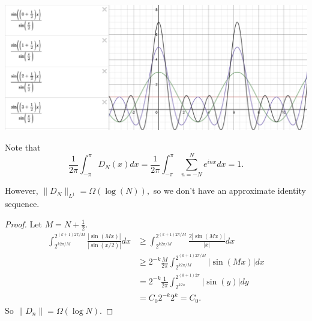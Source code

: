 \documentclass[11pt]{scrartcl}
\newcommand{\<}{\langle}
\renewcommand{\>}{\rangle}
\begin{document}
\begin{center}
\includegraphics[scale=0.35]{dn.png}
\end{center}

Note that $$\frac{1}{2\pi} \int_{-\pi}^\pi D_N(x)dx = \frac{1}{2\pi}\int_{-\pi}^\pi \sum_{n = -N}^N e^{inx}dx = 1.$$

However, $\|D_N\|_{L^1} = \Omega(\log (N)),$ so we don't have an approximate identity sequence. 
\begin{proof}
Let $M = N + \frac{1}{2}$.
\begin{align*}
\int_{2^{k2\pi/M}}^{2^{(k+1)2\pi/M}} \frac{|\sin(Mx)|}{|\sin(x/2)|}dx &\ge \int_{2^{k2\pi/M}}^{2^{(k+1)2\pi/M}} \frac{2|\sin(Mx)|}{|x|}dx \\
&\ge 2^{-k} \frac{M}{2\pi}\int_{2^{k2\pi/M}}^{2^{(k+1)2\pi/M}} |\sin(Mx)|dx \\
&= 2^{-k} \frac{1}{2\pi}\int_{2^{k2\pi}}^{2^{(k+1)2\pi}} |\sin(y)|dy\\
&= C_0 2^{-k}2^k = C_0.
\end{align*}
So $\|D_n\| = \Omega(\log N)$.
\end{proof}
\end{document}
